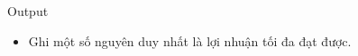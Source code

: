 Output  
\begin{itemize}
	\item     Ghi một số nguyên duy nhất là lợi nhuận tối đa đạt được.   
\end{itemize}